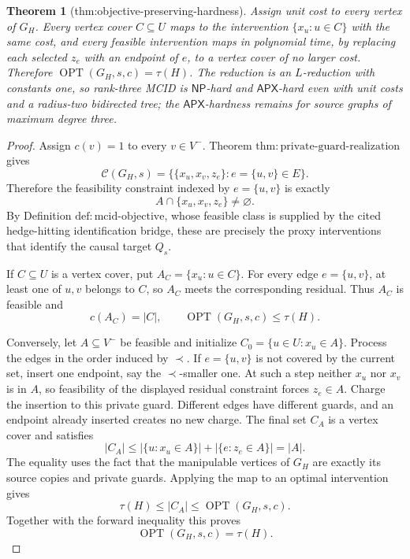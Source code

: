 \documentclass{article}
\newtheorem{theorem}{Theorem}
\begin{document}
\begin{theorem}[thm:objective-preserving-hardness]\label{thm:objective-preserving-hardness}
Assign unit cost to every vertex of \(G_H\). Every vertex cover \(C\subseteq U\) maps to the intervention \(\{x_u:u\in C\}\) with the same cost, and every feasible intervention maps in polynomial time, by replacing each selected \(z_e\) with an endpoint of \(e\), to a vertex cover of no larger cost. Therefore \(\operatorname{OPT}(G_H,s,c)=\tau(H)\). The reduction is an \(L\)-reduction with constants one, so rank-three MCID is \(\mathsf{NP}\)-hard and \(\mathsf{APX}\)-hard even with unit costs and a radius-two bidirected tree; the \(\mathsf{APX}\)-hardness remains for source graphs of maximum degree three.
\end{theorem}
\begin{proof}
Assign \(c(v)=1\) to every \(v\in V^{-}\).  Theorem
\(\mathrm{thm{:}private\mbox{-}guard\mbox{-}realization}\) gives
\[
 \mathcal C(G_H,s)
 =\bigl\{\{x_u,x_v,z_e\}:e=\{u,v\}\in E\bigr\}.
\]
Therefore the feasibility constraint indexed by \(e=\{u,v\}\) is exactly
\[
 A\cap\{x_u,x_v,z_e\}\neq\varnothing.
\]
By Definition \(\mathrm{def{:}mcid\mbox{-}objective}\), whose feasible
class is supplied by the cited hedge-hitting identification bridge, these
are precisely the proxy interventions that identify the causal target
\(Q_s\).

If \(C\subseteq U\) is a vertex cover, put
\(A_C=\{x_u:u\in C\}\).  For every edge \(e=\{u,v\}\), at least one of
\(u,v\) belongs to \(C\), so \(A_C\) meets the corresponding residual.
Thus \(A_C\) is feasible and
\[
 c(A_C)=|C|,
 \qquad
 \operatorname{OPT}(G_H,s,c)\leq\tau(H).
\]

Conversely, let \(A\subseteq V^{-}\) be feasible and initialize
\(C_0=\{u\in U:x_u\in A\}\).  Process the edges in the order induced by
\(\prec\).  If \(e=\{u,v\}\) is not covered by the current set, insert one
endpoint, say the \(\prec\)-smaller one.  At such a step neither \(x_u\)
nor \(x_v\) is in \(A\), so feasibility of the displayed residual
constraint forces \(z_e\in A\).  Charge the insertion to this private
guard.  Different edges have different guards, and an endpoint already
inserted creates no new charge.  The final set \(C_A\) is a vertex cover and
satisfies
\[
 |C_A|
 \leq |\{u:x_u\in A\}|+|\{e:z_e\in A\}|
 =|A|.
\]
The equality uses the fact that the manipulable vertices of \(G_H\) are
exactly its source copies and private guards.  Applying the map to an
optimal intervention gives
\[
 \tau(H)\leq |C_A|\leq\operatorname{OPT}(G_H,s,c).
\]
Together with the forward inequality this proves
\[
 \operatorname{OPT}(G_H,s,c)=\tau(H).
\]


\end{proof}
\end{document}
